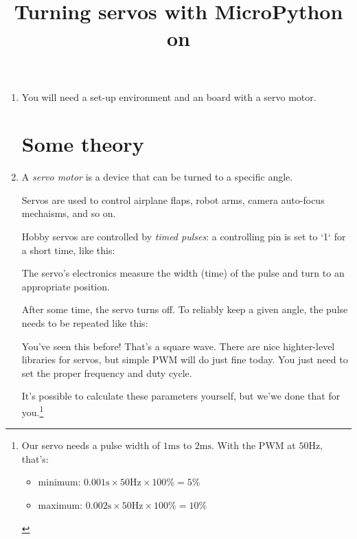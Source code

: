 \documentclass{../tutorial}
\title{Turning servos with MicroPython on \abbr{ESP32}}
\begin{document}
\begin{enumerate}

\item
    You will need a set-up environment and an \ESP board
    with a servo motor.

\section{Some theory}

\item
    A \emph{servo motor} is a device that can be turned to a specific angle.

    Servos are used to control airplane flaps, robot arms,
    camera auto-focus mechaisms, and so on.

    Hobby servos are controlled by \emph{timed pulses}: a controlling pin is
    set to `1` for a short time, like this:

    \begin{figure}[h]
        \centering
    \end{figure}

    \begin{figure}[h]
        \centering
    \end{figure}

    The servo's electronics measure the width (time) of the pulse and
    turn to an appropriate position.

    After some time, the servo turns off.
    To reliably keep a given angle,
    the pulse needs to be repeated like this:

    \begin{figure}[h]
        \centering
    \end{figure}

    You've seen this before! That's a square wave.
    There are nice highter-level libraries for servos,
    but simple PWM will do just fine today.
    You just need to set the proper frequency and duty cycle.

    It's possible to calculate these parameters yourself, but we'we done that
    for you.\footnote{
        Our servo needs a pulse width of
        $1 \si{\milli\second}$ to $2 \si{\milli\second}$.
        With the PWM at $50 \si{\hertz}$, that's:

        \begin{itemize}
        \item minimum:
            ${0.001 \si{\second}} \times {50 \si{\hertz}} \times 100\% = 5\%$
        \item maximum:
            ${0.002 \si{\second}} \times {50 \si{\hertz}} \times 100\% = 10\%$
        \end{itemize}

}
\end{enumerate}
\end{document}
